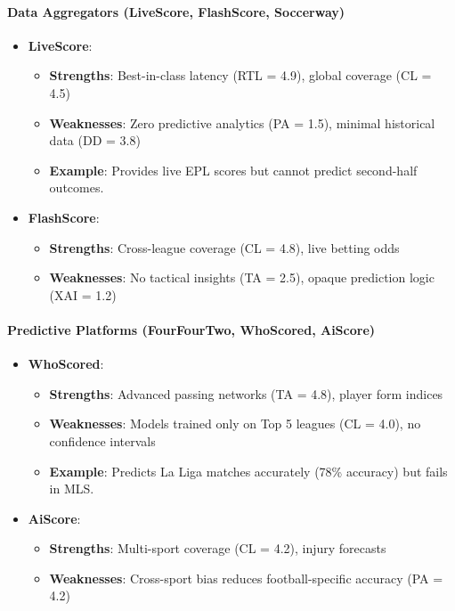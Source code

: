 \paragraph{Data Aggregators (LiveScore, FlashScore, Soccerway)}
\begin{itemize}
    \item \textbf{LiveScore}: 
    \begin{itemize}
        \item \textbf{Strengths}: Best-in-class latency (RTL = 4.9), global coverage (CL = 4.5)
        \item \textbf{Weaknesses}: Zero predictive analytics (PA = 1.5), minimal historical data (DD = 3.8)
        \item \textbf{Example}: Provides live EPL scores but cannot predict second-half outcomes.
    \end{itemize}
    
    \item \textbf{FlashScore}: 
    \begin{itemize}
        \item \textbf{Strengths}: Cross-league coverage (CL = 4.8), live betting odds
        \item \textbf{Weaknesses}: No tactical insights (TA = 2.5), opaque prediction logic (XAI = 1.2)
    \end{itemize}
\end{itemize}

\paragraph{Predictive Platforms (FourFourTwo, WhoScored, AiScore)}
\begin{itemize}
    \item \textbf{WhoScored}: 
    \begin{itemize}
        \item \textbf{Strengths}: Advanced passing networks (TA = 4.8), player form indices
        \item \textbf{Weaknesses}: Models trained only on Top 5 leagues (CL = 4.0), no confidence intervals
        \item \textbf{Example}: Predicts La Liga matches accurately (78\% accuracy) but fails in MLS.
    \end{itemize}
    
    \item \textbf{AiScore}: 
    \begin{itemize}
        \item \textbf{Strengths}: Multi-sport coverage (CL = 4.2), injury forecasts
        \item \textbf{Weaknesses}: Cross-sport bias reduces football-specific accuracy (PA = 4.2)
    \end{itemize}
\end{itemize}

